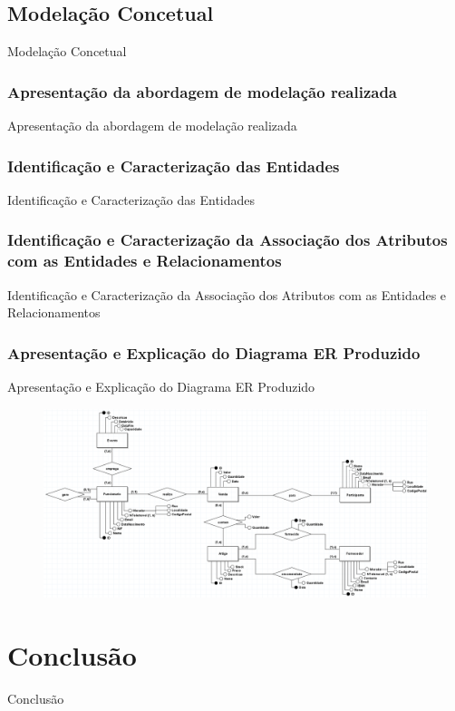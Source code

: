 \documentclass[compress,svgnames,handout,13.7pt]{beamer}
\begin{document}
\subsection{Modelação Concetual}
\begin{frame}{Modelação Concetual}
\end{frame}

\subsubsection{Apresentação da abordagem de modelação realizada}
\begin{frame}{Apresentação da abordagem de modelação realizada}
\end{frame}

\subsubsection{Identificação e Caracterização das Entidades}
\begin{frame}{Identificação e Caracterização das Entidades}
\end{frame}

\subsubsection{Identificação e Caracterização da Associação dos Atributos com as Entidades e Relacionamentos}
\begin{frame}{Identificação e Caracterização da Associação dos Atributos com as Entidades e Relacionamentos}
\end{frame}

\subsubsection{Apresentação e Explicação do Diagrama ER Produzido}
\begin{frame}{Apresentação e Explicação do Diagrama ER Produzido}
\begin{figure}[h]
            \centering
            \includegraphics[width=4.75in]{images/Conceitual_Com_Atributos.png}
        \end{figure}
\end{frame}

\section{Conclusão}
\begin{frame}{Conclusão}
\end{frame}

\thispagestyle{empty}
\frame{\titlepage}
\end{document}
